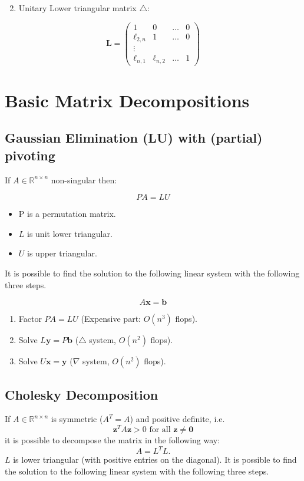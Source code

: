 \documentclass[11pt]{book}
\begin{document}
\begin{enumerate}
  \setcounter{enumi}{1}
  \item Unitary Lower triangular matrix $\triangle$:
\end{enumerate}

$$
\mathbf{L}=\left(\begin{array}{cccc}
1 & 0 & \ldots & 0 \\
\ell_{2, n} & 1 & \ldots & 0 \\
\vdots & & & \\
\ell_{n, 1} & \ell_{n, 2} & \ldots & 1
\end{array}\right)
$$

\section*{Basic Matrix Decompositions}
\subsection*{Gaussian Elimination (LU) with (partial) pivoting}
If $A \in \mathbb{R}^{n \times n}$ non-singular then:

$$
P A=L U
$$

\begin{itemize}
  \item $\mathrm{P}$ is a permutation matrix.

  \item $L$ is unit lower triangular.

  \item $U$ is upper triangular.

\end{itemize}
It is possible to find the solution to the following linear system  with the following three steps.

$$
A \mathbf{x}=\mathbf{b}
$$

\begin{enumerate}
  \item Factor $P A=L U$ (Expensive part: $O\left(n^{3}\right)$ flops).

  \item Solve $L \mathbf{y}=P \mathbf{b}$ ($\triangle$ system, $O\left(n^{2}\right)$ flops).

  \item Solve $U \mathbf{x}=\mathbf{y}$ ($\nabla$ system, $O\left(n^{2}\right)$ flops).

\end{enumerate}

\subsection*{Cholesky Decomposition}
If $A \in \mathbb{R}^{n \times n}$ is symmetric ($A^{T}=A$) and positive definite, i.e.
$$
\mathbf{z}^{T} A \mathbf{z}>0 \text { for all } \mathbf{z} \neq \mathbf{0}
$$
it is possible to decompose the matrix in the following way:
$$
A=L^{T} L.
$$
$L$ is lower triangular (with positive entries on the diagonal).
It is possible to find the solution to the following linear system  with the following three steps.
\end{document}
